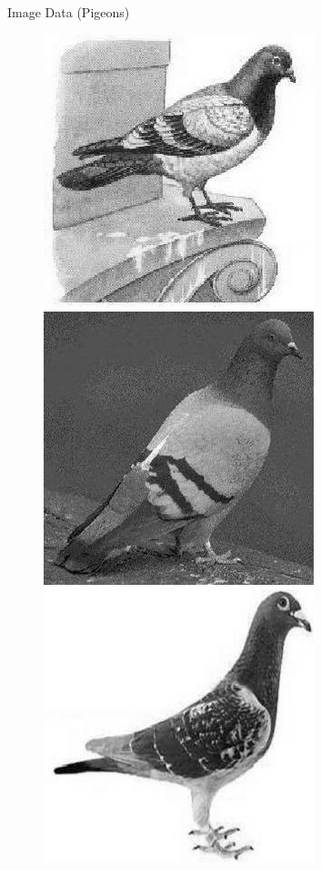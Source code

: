 \documentclass{beamer}
\begin{document}
\begin{frame}{Image Data (Pigeons)}
  \begin{figure}
    \centering
    \includegraphics[scale=.35]{pigeonrs-image_0001.jpg}
    \includegraphics[scale=.35]{pigeonrs-image_0002.jpg} \\
    \includegraphics[scale=.35]{pigeonrs-image_0003.jpg}

\end{figure}
\end{frame}
\end{document}
